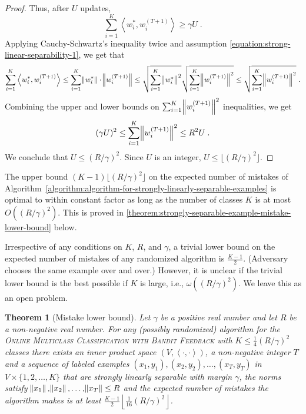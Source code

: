 \documentclass[12pt]{article}
\newtheorem{theorem}[definition]{Theorem}
\newcommand{\ip}[2]{\left\langle #1, #2 \right\rangle} %
\begin{document}
\begin{proof}
Thus, after $U$ updates,
$$
\sum_{i=1}^K \ip{w_i^*}{w_i^{(T+1)}} \ge \gamma U \; .
$$
Applying Cauchy-Schwartz's inequality twice and assumption
\eqref{equation:strong-linear-separability-1}, we get that
$$
\sum_{i=1}^K \ip{w_i^*}{w_i^{(T+1)}}
\le \sum_{i=1}^K \norm{w_i^*} \cdot \norm{w_i^{(T+1)}}
\le \sqrt{\sum_{i=1}^K \norm{w_i^*}^2} \sqrt{\sum_{i=1}^K \norm{w_i^{(T+1)}}^2}
\le \sqrt{\sum_{i=1}^K \norm{w_i^{(T+1)}}^2} \; .
$$
Combining the upper and lower bounds on $\sum_{i=1}^K \norm{w_i^{(T+1)}}^2$ inequalities, we get
$$
(\gamma U)^2 \le \sum_{i=1}^K \norm{w_i^{(T+1)}}^2 \le R^2 U \; .
$$
We conclude that $U \le (R/\gamma)^2$. Since $U$ is an integer, $U \le \lfloor (R/\gamma)^2 \rfloor$.
\end{proof}

The upper bound $(K-1) \lfloor (R/\gamma)^2 \rfloor$ on the expected number of
mistakes of
Algorithm~\ref{algorithm:algorithm-for-strongly-linearly-separable-examples} is
optimal to within constant factor as long as the number of classes $K$ is
at most $O((R/\gamma)^2)$. This is proved in
\autoref{theorem:strongly-separable-example-mistake-lower-bound} below.

Irrespective of any conditions on $K$, $R$, and $\gamma$, a trivial lower bound
on the expected number of mistakes of any randomized algorithm is
$\frac{K-1}{2}$. (Adversary chooses the same example over and over.) However, it
is unclear if the trivial lower bound is the best possible if $K$ is large,
i.e., $\omega((R/\gamma)^2)$. We leave this as an open problem.

\begin{theorem}[Mistake lower bound]
\label{theorem:strongly-separable-example-mistake-lower-bound}
Let $\gamma$ be a positive real number and let $R$ be a non-negative real
number. For any (possibly randomized) algorithm for the \textsc{Online
Multiclass Classification with Bandit Feedback} with $K \le
\frac{1}{4}(R/\gamma)^2$ classes there exists an inner product space $(V,
\ip{\cdot}{\cdot})$, a non-negative integer $T$ and a sequence of labeled
examples $(x_1, y_1), (x_2, y_2), \dots, (x_T, y_T)$ in $V \times
\{1,2,\dots,K\}$ that are strongly linearly separable with margin $\gamma$, the
norms satisfy $\norm{x_1}, \norm{x_2}, \dots, \norm{x_T} \le R$ and the expected
number of mistakes the algorithm makes is at least $\frac{K-1}{2} \left\lfloor
\frac{1}{16} (R/\gamma)^2 \right\rfloor$.
\end{theorem}
\end{document}
